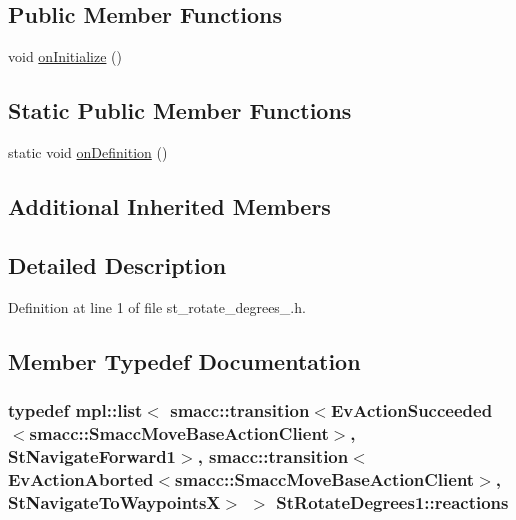 \subsection*{Public Member Functions}
\begin{DoxyCompactItemize}
\item 
void \hyperlink{structStRotateDegrees1_a43811c7ec53572baf0c9e6d6fc15909e}{on\+Initialize} ()
\end{DoxyCompactItemize}
\subsection*{Static Public Member Functions}
\begin{DoxyCompactItemize}
\item 
static void \hyperlink{structStRotateDegrees1_a4d11c284fe1956ae6ae0a4f8c1b5eb37}{on\+Definition} ()
\end{DoxyCompactItemize}
\subsection*{Additional Inherited Members}


\subsection{Detailed Description}


Definition at line 1 of file st\+\_\+rotate\+\_\+degrees\+\_.\+h.



\subsection{Member Typedef Documentation}
\subsubsection[{\texorpdfstring{reactions}{reactions}}]{\setlength{\rightskip}{0pt plus 5cm}typedef mpl\+::list$<$ {\bf smacc\+::transition}$<$Ev\+Action\+Succeeded$<${\bf smacc\+::\+Smacc\+Move\+Base\+Action\+Client}$>$, {\bf St\+Navigate\+Forward1}$>$, {\bf smacc\+::transition}$<$Ev\+Action\+Aborted$<${\bf smacc\+::\+Smacc\+Move\+Base\+Action\+Client}$>$, {\bf St\+Navigate\+To\+WaypointsX}$>$ $>$ {\bf St\+Rotate\+Degrees1\+::reactions}}\hypertarget{structStRotateDegrees1_af5c4ed6af710a02fcc0b1a16252fce38}{}\label{structStRotateDegrees1_af5c4ed6af710a02fcc0b1a16252fce38}


